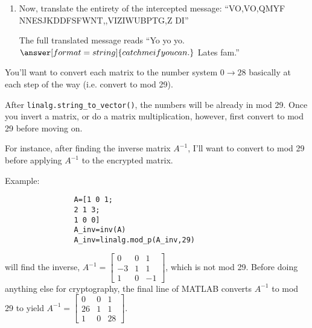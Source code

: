 \documentclass{ximera}
\begin{document}
\begin{problem}
\begin{enumerate}
\begin{problem}
\begin{enumerate}
                \item Now, translate the entirety of the intercepted message: ``VO,VO,QMYF NNESJKDDFSFWNT,,VIZIWUBPTG,Z DI''
                
                The full translated message reads ``Yo yo yo. $\answer[format=string]{catch me if you can.}$ Lates fam.''
            \end{enumerate}

            \begin{hint}
            
                You'll want to convert each matrix to the number system $0\rightarrow 28$ basically at each step of the way (i.e. convert to mod 29).

                After \texttt{linalg.string\_to\_vector()}, the numbers will be already in mod 29. Once you invert a matrix, or do a matrix multiplication, however, first convert to mod 29 before moving on. 

                For instance, after finding the inverse matrix $A^{-1}$, I'll want to convert to mod 29 before applying $A^{-1}$ to the encrypted matrix. 

                Example:

                \begin{verbatim}
                A=[1 0 1;
                2 1 3;
                1 0 0]
                A_inv=inv(A)
                A_inv=linalg.mod_p(A_inv,29)
                \end{verbatim}

                will find the inverse, $A^{-1}=\begin{bmatrix}
                    0 & 0 & 1\\-3 & 1 & 1\\1 & 0 & -1
                \end{bmatrix}$, which is not mod 29. Before doing anything else for cryptography, the final line of MATLAB converts $A^{-1}$ to mod 29 to yield $A^{-1}=\begin{bmatrix}
                    0 & 0 & 1\\ 26 & 1 & 1 \\ 1 & 0 & 28
                \end{bmatrix}.$

            \end{hint}

            
            
        \end{problem}


    \end{enumerate}

\end{problem}
\end{document}
